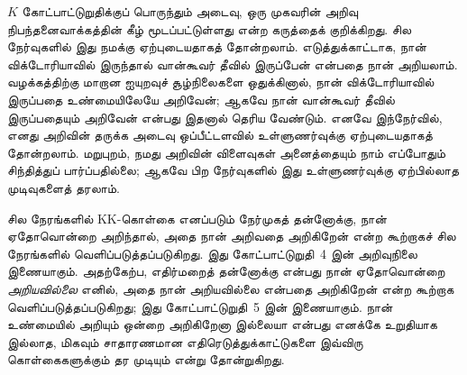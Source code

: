\documentclass[../../../include/open-logic-section]{subfiles}
\begin{document}
$K$ கோட்பாட்டுறுதிக்குப் பொருந்தும் அடைவு, ஒரு முகவரின் அறிவு
நிபந்தனைவாக்கத்தின் கீழ் மூடப்பட்டுள்ளது என்ற கருத்தைக் குறிக்கிறது. சில
நேர்வுகளில் இது நமக்கு ஏற்புடையதாகத் தோன்றலாம். எடுத்துக்காட்டாக, நான்
விக்டோரியாவில் இருந்தால் வான்கூவர் தீவில் இருப்பேன் என்பதை நான் அறியலாம்.
வழக்கத்திற்கு மாறான ஐயுறவுச் சூழ்நிலைகளை ஒதுக்கினால், நான் விக்டோரியாவில்
இருப்பதை உண்மையிலேயே அறிவேன்; ஆகவே நான் வான்கூவர் தீவில் இருப்பதையும்
அறிவேன் என்பது இதனால் தெரிய வேண்டும். எனவே இந்நேர்வில், எனது அறிவின்
தருக்க அடைவு ஒப்பீட்டளவில் உள்ளுணர்வுக்கு ஏற்புடையதாகத் தோன்றலாம். மறுபுறம்,
நமது அறிவின் விளைவுகள் அனைத்தையும் நாம் எப்போதும் சிந்தித்துப் பார்ப்பதில்லை;
ஆகவே பிற நேர்வுகளில் இது உள்ளுணர்வுக்கு ஏற்பில்லாத முடிவுகளைத் தரலாம்.

சில நேரங்களில் KK-கொள்கை எனப்படும் நேர்முகத் தன்னோக்கு, நான் ஏதோவொன்றை
அறிந்தால், அதை நான் அறிவதை அறிகிறேன் என்ற கூற்றாகச் சில நேரங்களில்
வெளிப்படுத்தப்படுகிறது. இது கோட்பாட்டுறுதி~4 இன் அறிவுநிலை இணையாகும்.
அதற்கேற்ப, எதிர்மறைத் தன்னோக்கு என்பது நான் ஏதோவொன்றை \emph{அறியவில்லை}
எனில், அதை நான் அறியவில்லை என்பதை அறிகிறேன் என்ற கூற்றாக
வெளிப்படுத்தப்படுகிறது; இது கோட்பாட்டுறுதி~5 இன் இணையாகும். நான் உண்மையில்
அறியும் ஒன்றை அறிகிறேனா இல்லையா என்பது எனக்கே உறுதியாக இல்லாத, மிகவும்
சாதாரணமான எதிரெடுத்துக்காட்டுகளை இவ்விரு கொள்கைகளுக்கும் தர முடியும் என்று
தோன்றுகிறது.
\end{document}
